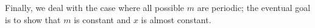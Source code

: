 \documentclass[11pt,reqno]{amsart}
\newtheorem{proposition}[theorem]{Proposition}
\newtheorem{corollary}[theorem]{Corollary}
\theoremstyle{definition}
\theoremstyle{plain}
\newcommand{\N}{\mathbb{N}}
\newcommand{\AuthornoteA}[2]{{\sf\small\color{magenta}{[#1: #2]}}}
\newcommand{\AuthornoteR}[2]{{\sf\small\color{blue}{[#1: #2]}}}
\newcommand{\Anote}{\AuthornoteA{A}}
\newcommand{\rp}{\AuthornoteR{R}}
\begin{document}














Finally, we deal with the case where all possible $m$ are periodic; the eventual goal is to show that $m$ is constant and $x$ is almost constant.
\end{document}
